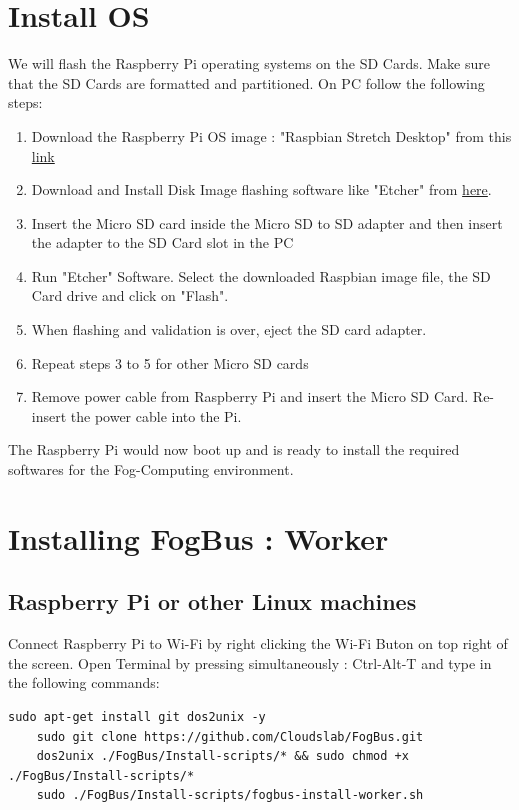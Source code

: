\documentclass{article}
\begin{document}
\section{Install OS}
We will flash the Raspberry Pi operating systems on the SD Cards. Make sure that the SD Cards are formatted and partitioned. On PC follow the following steps:
\begin{enumerate}
\item Download the Raspberry Pi OS image : "Raspbian Stretch Desktop" from this \href{https://downloads.raspberrypi.org/raspbian_latest}{link}
\item Download and Install Disk Image flashing software like "Etcher" from \href{https://etcher.io/}{here}.
\item Insert the Micro SD card inside the Micro SD to SD adapter and then insert the adapter to the SD Card slot in the PC
\item Run "Etcher" Software. Select the downloaded Raspbian image file, the SD Card drive and click on "Flash".
\item When flashing and validation is over, eject the SD card adapter. 
\item Repeat steps 3 to 5 for other Micro SD cards
\item Remove power cable from Raspberry Pi and insert the Micro SD Card. Re-insert the power cable into the Pi.
\end{enumerate}

The Raspberry Pi would now boot up and is ready to install the required softwares for the Fog-Computing environment.

\newpage

\section{Installing FogBus : Worker}

\subsection{Raspberry Pi or other Linux machines}
Connect Raspberry Pi to Wi-Fi by right clicking the Wi-Fi Buton on top right of the screen. Open Terminal by pressing simultaneously : Ctrl-Alt-T and type in the following commands: 

\begin{lstlisting}[style=BashInputStyle]
    sudo apt-get install git dos2unix -y
    sudo git clone https://github.com/Cloudslab/FogBus.git
    dos2unix ./FogBus/Install-scripts/* && sudo chmod +x ./FogBus/Install-scripts/*
    sudo ./FogBus/Install-scripts/fogbus-install-worker.sh
\end{lstlisting}
\end{document}
